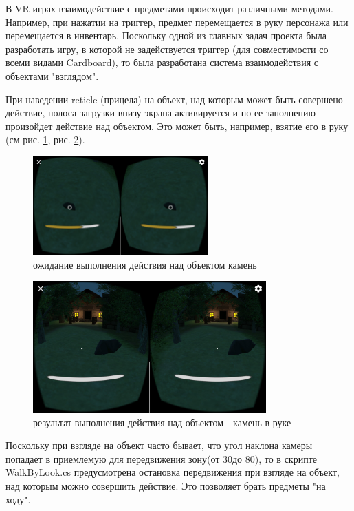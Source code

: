 \tab[0.75cm]В VR играх взаимодействие с предметами происходит различными методами. Например, при нажатии на триггер, предмет перемещается в руку персонажа или перемещается в инвентарь. Поскольку одной из главных задач проекта была разработать игру, в которой не 
задействуется триггер (для совместимости со всеми видами Cardboard), то была 
разработана система взаимодействия с объектами "взглядом".

При наведении reticle (прицела) на объект, над которым может быть совершено действие, полоса загрузки внизу экрана активируется и по ее заполнению произойдет действие над объектом. Это может быть, например, взятие его в руку (см рис. \ref{pick_stone}, рис. \ref{picked_stone}).

\begin{figure}[h!]
	\centering
	\includegraphics[width=0.6\textwidth]{./screenshots/pick_stone1.jpg}
	\caption{\small{ожидание выполнения действия над объектом камень}}
	\label{pick_stone}
\end{figure} 

\begin{figure}[h!]
	\centering
	\includegraphics[width=0.8\textwidth]{./screenshots/picked_stone1.jpg}
	\caption{\small{результат выполнения действия над объектом - камень в руке}}
	\label{picked_stone}
\end{figure} 

\tab[0.75cm]Поскольку при взгляде на объект часто бывает, что угол наклона камеры попадает в приемлемую для передвижения зону(от 30\degr до 80\degr), то в скрипте WalkByLook.cs предусмотрена остановка передвижения при взгляде на объект, над которым можно совершить действие. Это позволяет брать предметы "на ходу". 

